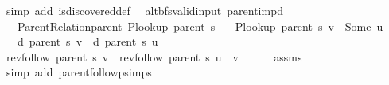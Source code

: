 \begin{isabellebody}
\ {\isacharparenleft}{\kern0pt}simp\ add{\isacharcolon}{\kern0pt}\ is{\isacharunderscore}{\kern0pt}discovered{\isacharunderscore}{\kern0pt}def{\isacharparenright}{\kern0pt}%
\endisatagproof
{\isafoldproof}%
%
\isadelimproof
%
\endisadelimproof
%
\isadelimdocument
%
\endisadelimdocument
%
\isatagdocument
%
\isamarkuptrue%
%
\isamarkuptrue%
%
\endisatagdocument
{\isafolddocument}%
%
\isadelimdocument
%
\endisadelimdocument
{}\isamarkupfalse%
\ {\isacharparenleft}{\kern0pt}\ alt{\isacharunderscore}{\kern0pt}bfs{\isacharunderscore}{\kern0pt}valid{\isacharunderscore}{\kern0pt}input{\isacharparenright}{\kern0pt}\ parent{\isacharunderscore}{\kern0pt}imp{\isacharunderscore}{\kern0pt}d{\isacharcolon}{\kern0pt}\isanewline
\ \ \ {\isachardoublequoteopen}Parent{\isacharunderscore}{\kern0pt}Relation{\isachardot}{\kern0pt}parent\ {\isacharparenleft}{\kern0pt}P{\isacharunderscore}{\kern0pt}lookup\ {\isacharparenleft}{\kern0pt}parent\ s{\isacharparenright}{\kern0pt}{\isacharparenright}{\kern0pt}{\isachardoublequoteclose}\isanewline
\ \ \ {\isachardoublequoteopen}P{\isacharunderscore}{\kern0pt}lookup\ {\isacharparenleft}{\kern0pt}parent\ s{\isacharparenright}{\kern0pt}\ v\ {\isacharequal}{\kern0pt}\ Some\ u{\isachardoublequoteclose}\isanewline
\ \ \ {\isachardoublequoteopen}d\ {\isacharparenleft}{\kern0pt}parent\ s{\isacharparenright}{\kern0pt}\ v\ {\isacharequal}{\kern0pt}\ d\ {\isacharparenleft}{\kern0pt}parent\ s{\isacharparenright}{\kern0pt}\ u\ {\isacharplus}{\kern0pt}\ {}{\isachardoublequoteclose}\isanewline
%
\isadelimproof
%
\endisadelimproof
%
\isatagproof
{}\isamarkupfalse%
\ {\isacharminus}{\kern0pt}\isanewline
\ \ \isamarkupfalse%
\ {\isachardoublequoteopen}rev{\isacharunderscore}{\kern0pt}follow\ {\isacharparenleft}{\kern0pt}parent\ s{\isacharparenright}{\kern0pt}\ v\ {\isacharequal}{\kern0pt}\ rev{\isacharunderscore}{\kern0pt}follow\ {\isacharparenleft}{\kern0pt}parent\ s{\isacharparenright}{\kern0pt}\ u\ {\isacharat}{\kern0pt}\ {\isacharbrackleft}{\kern0pt}v{\isacharbrackright}{\kern0pt}{\isachardoublequoteclose}\isanewline
\ \ \ \ \isamarkupfalse%
\ assms\isanewline
\ \ \ \ \isamarkupfalse%
\ {\isacharparenleft}{\kern0pt}simp\ add{\isacharcolon}{\kern0pt}\ parent{\isachardot}{\kern0pt}follow{\isacharunderscore}{\kern0pt}psimps{\isacharparenright}{\kern0pt}\isanewline

\end{isabellebody}
